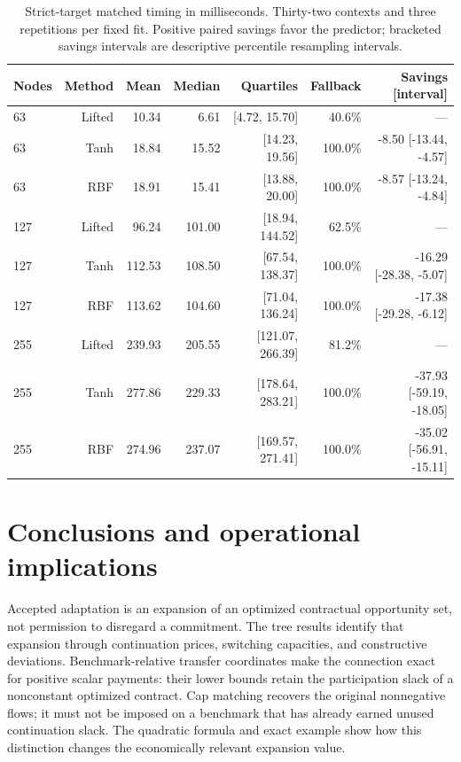\documentclass[11pt,letterpaper]{article}
\theoremstyle{definition}
\newcommand{\1}{\mathbf 1}
\begin{document}
\begin{table}[tbp]\centering\small\setlength{\tabcolsep}{4pt}
\caption{Strict-target matched timing in milliseconds. Thirty-two contexts and three repetitions per fixed fit. Positive paired savings favor the predictor; bracketed savings intervals are descriptive percentile resampling intervals.}
\label{tab:r24-timing}
\begin{tabular}{lrrrrrr}
\toprule
Nodes & Method & Mean & Median & Quartiles & Fallback & Savings [interval]\\
\midrule
63 & Lifted & 10.34 & 6.61 & [4.72, 15.70] & 40.6\% & ---\\
63 & Tanh & 18.84 & 15.52 & [14.23, 19.56] & 100.0\% & -8.50 [-13.44, -4.57]\\
63 & RBF & 18.91 & 15.41 & [13.88, 20.00] & 100.0\% & -8.57 [-13.24, -4.84]\\
127 & Lifted & 96.24 & 101.00 & [18.94, 144.52] & 62.5\% & ---\\
127 & Tanh & 112.53 & 108.50 & [67.54, 138.37] & 100.0\% & -16.29 [-28.38, -5.07]\\
127 & RBF & 113.62 & 104.60 & [71.04, 136.24] & 100.0\% & -17.38 [-29.28, -6.12]\\
255 & Lifted & 239.93 & 205.55 & [121.07, 266.39] & 81.2\% & ---\\
255 & Tanh & 277.86 & 229.33 & [178.64, 283.21] & 100.0\% & -37.93 [-59.19, -18.05]\\
255 & RBF & 274.96 & 237.07 & [169.57, 271.41] & 100.0\% & -35.02 [-56.91, -15.11]\\
\bottomrule
\end{tabular}
\end{table}


\section{Conclusions and operational implications}
Accepted adaptation is an expansion of an optimized contractual opportunity
set, not permission to disregard a commitment. The tree results identify that
expansion through continuation prices, switching capacities, and constructive
deviations. Benchmark-relative transfer coordinates make the connection exact
for positive scalar payments: their lower bounds retain the participation
slack of a nonconstant optimized contract. Cap matching recovers the original
nonnegative flows; it must not be imposed on a benchmark that has already
earned unused continuation slack. The quadratic formula and exact example show
how this distinction changes the economically relevant expansion value.
\end{document}
